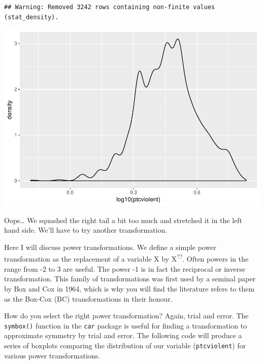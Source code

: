 \documentclass[]{book}
\newenvironment{Shaded}{\begin{snugshade}}{\end{snugshade}}
\newcommand{\DataTypeTok}[1]{\textcolor[rgb]{0.13,0.29,0.53}{#1}}
\newcommand{\KeywordTok}[1]{\textcolor[rgb]{0.13,0.29,0.53}{\textbf{#1}}}
\newcommand{\NormalTok}[1]{#1}
\newcommand{\OperatorTok}[1]{\textcolor[rgb]{0.81,0.36,0.00}{\textbf{#1}}}
\theoremstyle{definition}
\theoremstyle{definition}
\theoremstyle{definition}
\theoremstyle{remark}
\begin{document}
\begin{verbatim}
## Warning: Removed 3242 rows containing non-finite values (stat_density).
\end{verbatim}

\includegraphics{06-hypothesis_testing_files/figure-latex/unnamed-chunk-20-1.pdf}

Oops\ldots{} We squashed the right tail a bit too much and stretched it
in the left hand side. We'll have to try another transformation.

Here I will discuss power transformations. We define a simple power
transformation as the replacement of a variable X by
X\textsuperscript{??}. Often powers in the range from -2 to 3 are
useful. The power -1 is in fact the reciprocal or inverse
transformation. This family of transformations was first used by a
seminal paper by Box and Cox in 1964, which is why you will find the
literature refers to them as the Box-Cox (BC) transformations in their
honour.

How do you select the right power transformation? Again, trial and
error. The \texttt{symbox()} function in the \texttt{car} package is
useful for finding a transformation to approximate symmetry by trial and
error. The following code will produce a series of boxplots comparing
the distribution of our variable (\texttt{ptcviolent}) for various power
transformations.

\begin{Shaded}
\end{Shaded}
\end{document}
